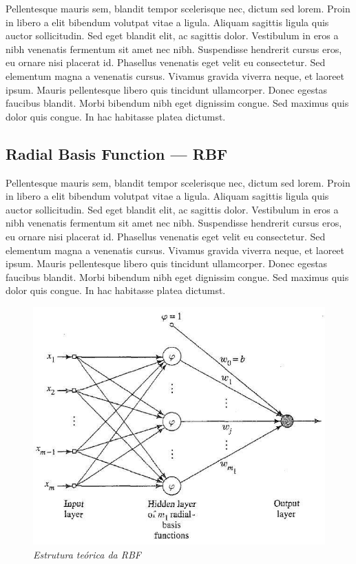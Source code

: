 \documentclass[10pt,twocolumn,letterpaper]{article}
\begin{document}
Pellentesque mauris sem, blandit tempor scelerisque nec, dictum sed lorem. Proin in libero a elit bibendum volutpat vitae a ligula. Aliquam sagittis ligula quis auctor sollicitudin. Sed eget blandit elit, ac sagittis dolor. Vestibulum in eros a nibh venenatis fermentum sit amet nec nibh. Suspendisse hendrerit cursus eros, eu ornare nisi placerat id. Phasellus venenatis eget velit eu consectetur. Sed elementum magna a venenatis cursus. Vivamus gravida viverra neque, et laoreet ipsum. Mauris pellentesque libero quis tincidunt ullamcorper. Donec egestas faucibus blandit. Morbi bibendum nibh eget dignissim congue. Sed maximus quis dolor quis congue. In hac habitasse platea dictumst.

\subsection{Radial Basis Function --- RBF}
Pellentesque mauris sem, blandit tempor scelerisque nec, dictum sed lorem. Proin in libero a elit bibendum volutpat vitae a ligula. Aliquam sagittis ligula quis auctor sollicitudin. Sed eget blandit elit, ac sagittis dolor. Vestibulum in eros a nibh venenatis fermentum sit amet nec nibh. Suspendisse hendrerit cursus eros, eu ornare nisi placerat id. Phasellus venenatis eget velit eu consectetur. Sed elementum magna a venenatis cursus. Vivamus gravida viverra neque, et laoreet ipsum. Mauris pellentesque libero quis tincidunt ullamcorper. Donec egestas faucibus blandit. Morbi bibendum nibh eget dignissim congue. Sed maximus quis dolor quis congue. In hac habitasse platea dictumst.
\begin{figure}[h]
\begin{center}
\includegraphics[scale=0.3]{foto1.jpg}
\caption{\textit{Estrutura teórica da RBF}}
\end{center}
\end{figure}
\end{document}
